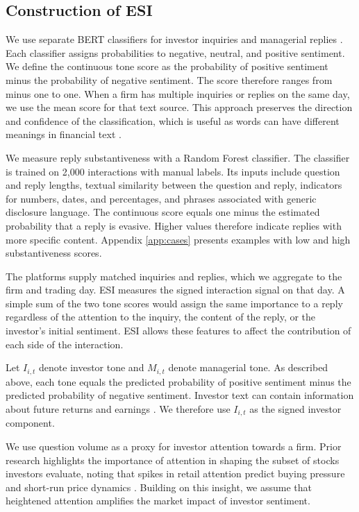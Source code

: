 \documentclass[12pt]{article}
\begin{document}
\subsection{Construction of ESI}\label{sec:esi_construction}

We use separate BERT classifiers for investor inquiries and managerial replies \citep{liu2020finbert}. Each classifier assigns probabilities to negative, neutral, and positive sentiment. We define the continuous tone score as the probability of positive sentiment minus the probability of negative sentiment. The score therefore ranges from minus one to one. When a firm has multiple inquiries or replies on the same day, we use the mean score for that text source. This approach preserves the direction and confidence of the classification, which is useful as words can have different meanings in financial text \citep{loughran2011}.

We measure reply substantiveness with a Random Forest classifier. The classifier is trained on 2,000 interactions with manual labels. Its inputs include question and reply lengths, textual similarity between the question and reply, indicators for numbers, dates, and percentages, and phrases associated with generic disclosure language. The continuous score equals one minus the estimated probability that a reply is evasive. Higher values therefore indicate replies with more specific content. Appendix \ref{app:cases} presents examples with low and high substantiveness scores.

The platforms supply matched inquiries and replies, which we aggregate to the firm and trading day. ESI measures the signed interaction signal on that day. A simple sum of the two tone scores would assign the same importance to a reply regardless of the attention to the inquiry, the content of the reply, or the investor's initial sentiment. ESI allows these features to affect the contribution of each side of the interaction.

Let $I_{i,t}$ denote investor tone and $M_{i,t}$ denote managerial tone. As described above, each tone equals the predicted probability of positive sentiment minus the predicted probability of negative sentiment. Investor text can contain information about future returns and earnings \citep{bartov2018,chen2014,cookson2024}. We therefore use $I_{i,t}$ as the signed investor component.

We use question volume as a proxy for investor attention towards a firm. Prior research highlights the importance of attention in shaping the subset of stocks investors evaluate, noting that spikes in retail attention predict buying pressure and short-run price dynamics \citep{barber2008,da2011}. Building on this insight, we assume that heightened attention amplifies the market impact of investor sentiment. 
\end{document}
